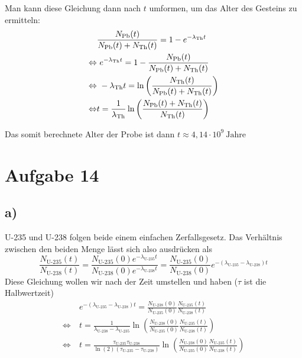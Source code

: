 \documentclass[12pt]{article}
\begin{document}
Man kann diese Gleichung dann nach $t$ umformen, um das Alter des Gesteins zu ermitteln:
\begin{align*}
    &\frac{N_{\ce{Pb}}(t)}{N_{\ce{Pb}}(t)+N_{\ce{Th}}(t)} = 1 - e^{-\lambda_{\ce{Th}} t} \\
    \Leftrightarrow& \ e^{-\lambda_{\ce{Th}} t} = 1 - \frac{N_{\ce{Pb}}(t)}{N_{\ce{Pb}}(t)+N_{\ce{Th}}(t)} \\
    \Leftrightarrow& \ -\lambda_{\ce{Th}} t = \ln \left( \frac{N_{\ce{Th}}(t)}{N_{\ce{Pb}}(t)+N_{\ce{Th}}(t)} \right) \\
    \Leftrightarrow& t = \frac{1}{\lambda_{\ce{Th}}} \ln \left( \frac{N_{\ce{Pb}}(t)+N_{\ce{Th}}(t)}{N_{\ce{Th}}(t)} \right)
\end{align*}

Das somit berechnete Alter der Probe ist dann $t \approx 4,14 \cdot 10^9 \ \text{Jahre}$

\section{Aufgabe 14}

\subsection{a)}

U-235 und U-238 folgen beide einem einfachen Zerfallsgesetz. Das Verhältnis zwischen den beiden Menge lässt sich also ausdrücken als
$$\frac{N_\text{U-235}(t)}{N_\text{U-238}(t)} = \frac{N_\text{U-235}(0) e^{-\lambda_\text{U-235}t}}{N_\text{U-238}(0)e^{-\lambda_\text{U-238}t}} = \frac{N_\text{U-235}(0)}{N_\text{U-238}(0)} e^{-(\lambda_\text{U-235} - \lambda_\text{U-238}) t}$$
Diese Gleichung wollen wir nach der Zeit umstellen und haben ($\tau$ ist die Halbwertzeit)
\begin{align*}
    &e^{-(\lambda_\text{U-235} - \lambda_\text{U-238}) t} =\frac{N_\text{U-238}(0)}{N_\text{U-235}(0)} \frac{N_\text{U-235}(t)}{N_\text{U-238}(t)}\\
    \Leftrightarrow \ & t = \frac{1}{\lambda_\text{U-238} - \lambda_\text{U-235}} \ln \left( \frac{N_\text{U-238}(0)}{N_\text{U-235}(0)} \frac{N_\text{U-235}(t)}{N_\text{U-238}(t)} \right) \\
    \Leftrightarrow \ & t = \frac{\tau_\text{U-235}\tau_\text{U-238}}{\ln(2)(\tau_\text{U-235}- \tau_\text{U-238})}\ln \left( \frac{N_\text{U-238}(0)}{N_\text{U-235}(0)} \frac{N_\text{U-235}(t)}{N_\text{U-238}(t)} \right)
\end{align*}
\end{document}
